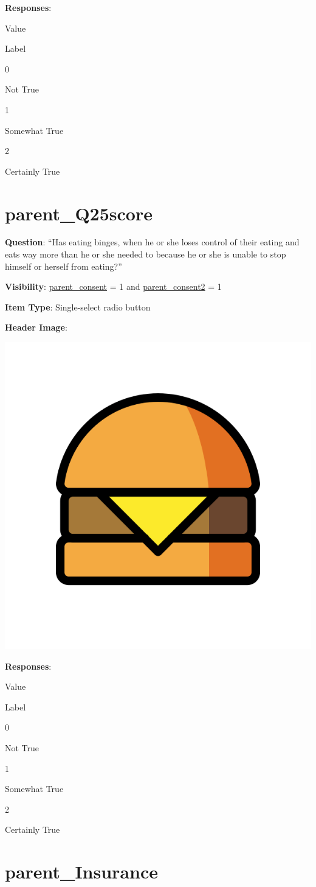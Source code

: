 \documentclass[]{book}
\begin{document}
\textbf{Responses}:

Value

Label

0

Not True

1

Somewhat True

2

Certainly True

\hypertarget{parent_q25score}{%
\section{parent\_Q25score}\label{parent_q25score}}

\textbf{Question}: ``Has eating binges, when he or she loses control of their eating and eats way more than he or she needed to because he or she is unable to stop himself or herself from eating?''

\textbf{Visibility}: \protect\hyperlink{parent_consent}{parent\_consent} = 1 and \protect\hyperlink{parent_consent2}{parent\_consent2} = 1

\textbf{Item Type}: Single-select radio button

\textbf{Header Image}:

\begin{flushleft}\includegraphics[width=0.33\linewidth]{downloadFigs4latex_HBN_PMHS_Codebook/parent_Q25score_headerImg} \end{flushleft}

\textbf{Responses}:

Value

Label

0

Not True

1

Somewhat True

2

Certainly True

\hypertarget{parent_insurance}{%
\section{parent\_Insurance}\label{parent_insurance}}
\end{document}
